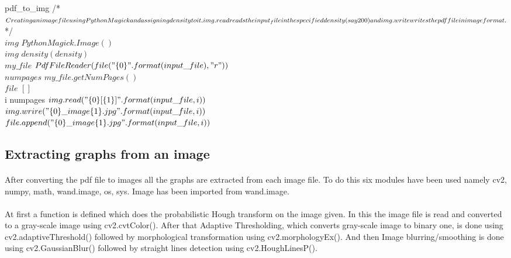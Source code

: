 \documentclass[12pts]{scrreprt}
\begin{document}
\begin{pseudocode}{pdf_to_img}{ }
/\mbox{*}$Creating an image file using PythonMagick and assigning density to it.\\img.read reads the input_file in the specified density(say 200) and \\img.write writes the pdf file in image format.$ \mbox{*}/\\
$img $ \GETS $ PythonMagick.Image() $\\
$img $ \cdot $ density(density) $\\
$my\_file $ \GETS $ PdfFileReader(file("\{0\}".format(input\_file),"r")) $\\
$numpages $ \GETS $ my\_file.getNumPages() $\\
$file $ \GETS $ [ ] $\\ 
\FOR i  \TO numpages \DO
\BEGIN
$img.read("\{0\}[\{1\}]".format(input\_file,i))$\\
$img.wrire("\{0\}\_image\{1\}.jpg".format(input\_file,i))$\\
$file.append("\{0\}\_image\{1\}.jpg".format(input\_file,i))$\\
\END
\end{pseudocode}
\subsection{Extracting graphs from an image}
\paragraph{}
After converting the pdf file to images all the graphs are extracted from each image file. To do this six modules have been used namely cv2, numpy, math, wand.image, os, sys. Image has been imported from wand.image.
\paragraph{}
At first a function is defined which does the probabilistic Hough transform on the image given. In this the image file is read and converted to a gray-scale image using cv2.cvtColor(). After that Adaptive Thresholding, which converts gray-scale image to binary one, is done using cv2.adaptiveThreshold() followed by morphological transformation using cv2.morphologyEx(). And then Image blurring/smoothing is done using cv2.GaussianBlur() followed by straight lines detection using cv2.HoughLinesP().
\end{document}
